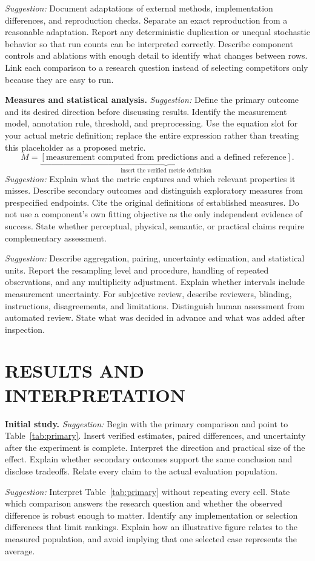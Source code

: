 \documentclass[]{spie}
\newcommand{\suggest}{\textit{Suggestion:} }
\begin{document}
\suggest Document adaptations of external methods, implementation differences, and reproduction checks. Separate an exact reproduction from a reasonable adaptation. Report any deterministic duplication or unequal stochastic behavior so that run counts can be interpreted correctly. Describe component controls and ablations with enough detail to identify what changes between rows. Link each comparison to a research question instead of selecting competitors only because they are easy to run.

\textbf{Measures and statistical analysis.} \suggest Define the primary outcome and its desired direction before discussing results. Identify the measurement model, annotation rule, threshold, and preprocessing.\cite{slot31,slot32} Use the equation slot for your actual metric definition; replace the entire expression rather than treating this placeholder as a proposed metric.
\begin{equation}
M=\underbrace{[\text{measurement computed from predictions and a defined reference}]}_{\text{insert the verified metric definition}}.
\label{eq:metric}
\end{equation}
\suggest Explain what the metric captures and which relevant properties it misses. Describe secondary outcomes and distinguish exploratory measures from prespecified endpoints. Cite the original definitions of established measures.\cite{slot33,slot34,slot35,slot36,slot37} Do not use a component's own fitting objective as the only independent evidence of success. State whether perceptual, physical, semantic, or practical claims require complementary assessment.

\suggest Describe aggregation, pairing, uncertainty estimation, and statistical units. Report the resampling level and procedure, handling of repeated observations, and any multiplicity adjustment. Explain whether intervals include measurement uncertainty. For subjective review, describe reviewers, blinding, instructions, disagreements, and limitations. Distinguish human assessment from automated review. State what was decided in advance and what was added after inspection.

\section{RESULTS AND INTERPRETATION}\label{sec:results}
\textbf{Initial study.} \suggest Begin with the primary comparison and point to Table~\ref{tab:primary}. Insert verified estimates, paired differences, and uncertainty after the experiment is complete. Interpret the direction and practical size of the effect. Explain whether secondary outcomes support the same conclusion and disclose tradeoffs. Relate every claim to the actual evaluation population.
\newpage

\suggest Interpret Table~\ref{tab:primary} without repeating every cell. State which comparison answers the research question and whether the observed difference is robust enough to matter. Identify any implementation or selection differences that limit rankings. Explain how an illustrative figure relates to the measured population, and avoid implying that one selected case represents the average.
\end{document}
